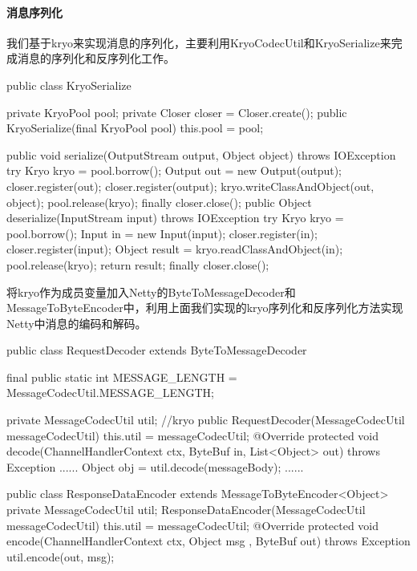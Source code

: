 \documentclass[a4paper, 12pt]{article}
\theoremstyle{definition}
\begin{document}
\paragraph{消息序列化}
我们基于kryo来实现消息的序列化，主要利用KryoCodecUtil和KryoSerialize来完成消息的序列化和反序列化工作。
\begin{scala}
 public class KryoSerialize {
    private KryoPool pool;
    private Closer closer = Closer.create();
    public KryoSerialize(final KryoPool pool) {
        this.pool = pool;
    }

    public void serialize(OutputStream output, Object object) throws IOException {
        try {
            Kryo kryo = pool.borrow();
            Output out = new Output(output);
            closer.register(out);
            closer.register(output);
            kryo.writeClassAndObject(out, object);
            pool.release(kryo);
        } finally {
            closer.close();
        }
    }
    public Object deserialize(InputStream input) throws IOException {
        try {
            Kryo kryo = pool.borrow();
            Input in = new Input(input);
            closer.register(in);
            closer.register(input);
            Object result = kryo.readClassAndObject(in);
            pool.release(kryo);
            return result;
        } finally {
            closer.close();
        }
    }
}
\end{scala}
将kryo作为成员变量加入Netty的ByteToMessageDecoder和MessageToByteEncoder中，利用上面我们实现的kryo序列化和反序列化方法实现Netty中消息的编码和解码。
\begin{scala}
 public class RequestDecoder extends ByteToMessageDecoder {
    final public static int MESSAGE_LENGTH = MessageCodecUtil.MESSAGE_LENGTH;
  
    private MessageCodecUtil util; //kryo
    public RequestDecoder(MessageCodecUtil messageCodecUtil) {
        this.util = messageCodecUtil;
    }
    @Override
    protected void decode(ChannelHandlerContext ctx,
                          ByteBuf in, List<Object> out) throws Exception {
      	......
        Object obj = util.decode(messageBody);
      	......
     }
}
\end{scala}

\begin{scala}
 public class ResponseDataEncoder extends MessageToByteEncoder<Object> {
    private MessageCodecUtil util;
    ResponseDataEncoder(MessageCodecUtil messageCodecUtil) {
        this.util = messageCodecUtil;
    }
    @Override
    protected void encode(ChannelHandlerContext ctx, Object msg
                          , ByteBuf out) throws Exception {
        util.encode(out, msg);
    }
}
\end{scala}
\end{document}

